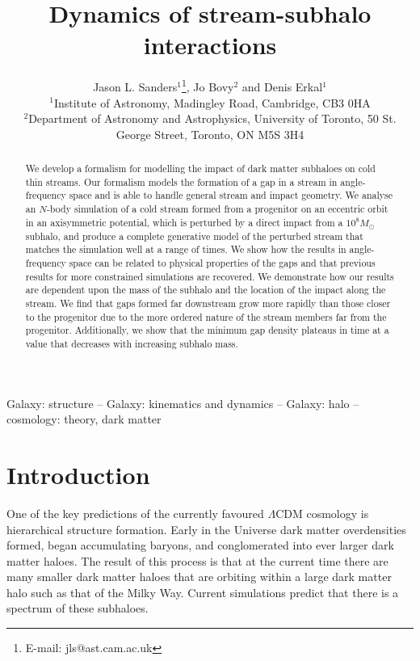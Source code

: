 \documentclass[useAMS,usenatbib,fleqn,a4paper]{mn2e}
\title{Dynamics of stream-subhalo interactions}
\author[J. L. Sanders, J. Bovy and D. Erkal]{Jason L. Sanders$^1$\thanks{E-mail: jls@ast.cam.ac.uk}, Jo Bovy$^2$ and Denis Erkal$^1$\\
$^1$Institute of Astronomy, Madingley Road, Cambridge, CB3 0HA\\
$^2$Department of Astronomy and Astrophysics, University of Toronto, 50 St. George Street, Toronto, ON M5S 3H4}
\begin{document}
\maketitle
\label{firstpage}
\begin{abstract}
We develop a formalism for modelling the impact of dark matter subhaloes on cold thin streams. Our formalism models the formation of a gap in a stream in angle-frequency space and is able to handle general stream and impact geometry. We analyse an $N$-body simulation of a cold stream formed from a progenitor on an eccentric orbit in an axisymmetric potential, which is perturbed by a direct impact from a $10^8 M_\odot$ subhalo, and produce a complete generative model of the perturbed stream that matches the simulation well at a range of times. We show how the results in angle-frequency space can be related to physical properties of the gaps and that previous results for more constrained simulations are recovered. We demonstrate how our results are dependent upon the mass of the subhalo and the location of the impact along the stream. We find that gaps formed far downstream grow more rapidly than those closer to the progenitor due to the more ordered nature of the stream members far from the progenitor. Additionally, we show that the minimum gap density plateaus in time at a value that decreases with increasing subhalo mass.
\end{abstract}

\begin{keywords}
Galaxy: structure -- Galaxy: kinematics and dynamics -- Galaxy: halo -- cosmology: theory, dark matter
\end{keywords}

\section{Introduction}

One of the key predictions of the currently favoured $\Lambda$CDM cosmology is hierarchical structure formation. Early in the Universe dark matter overdensities formed, began accumulating baryons, and conglomerated into ever larger dark matter haloes. The result of this process is that at the current time there are many smaller dark matter haloes that are orbiting within a large dark matter halo such as that of the Milky Way. Current simulations \citep[e.g.][]{Diemand2008,Springel2008} predict that there is a spectrum of these subhaloes.
\end{document}
